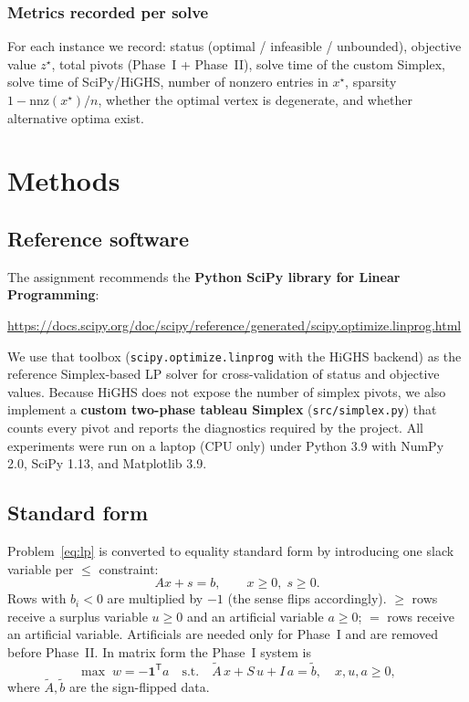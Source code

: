 \documentclass[10pt]{article}
\begin{document}
\subsubsection*{Metrics recorded per solve}
For each instance we record: status (optimal / infeasible / unbounded),
objective value $z^\star$, total pivots (Phase~I + Phase~II), solve time of
the custom Simplex, solve time of SciPy/HiGHS, number of nonzero entries in
$x^\star$, sparsity $1-\mathrm{nnz}(x^\star)/n$, whether the optimal vertex is
degenerate, and whether alternative optima exist.

\section{Methods}
\label{sec:methods}

\subsection{Reference software}
The assignment recommends the \textbf{Python SciPy library for Linear
Programming}:
\begin{center}
\footnotesize\url{https://docs.scipy.org/doc/scipy/reference/generated/scipy.optimize.linprog.html}
\end{center}
We use that toolbox (\texttt{scipy.optimize.linprog} with the HiGHS backend)
as the reference Simplex-based LP solver for cross-validation of status and
objective values.  Because HiGHS does not expose the number of simplex
pivots, we also implement a \textbf{custom two-phase tableau Simplex}
(\texttt{src/simplex.py}) that counts every pivot and reports the
diagnostics required by the project.  All experiments were run on a laptop
(CPU only) under Python 3.9 with NumPy 2.0, SciPy 1.13, and Matplotlib 3.9.

\subsection{Standard form}
Problem~\eqref{eq:lp} is converted to equality standard form by introducing
one slack variable per $\le$ constraint:
\begin{equation}
\label{eq:std}
A x + s = b,\qquad x \ge 0,\; s \ge 0.
\end{equation}
Rows with $b_i < 0$ are multiplied by $-1$ (the sense flips accordingly).
$\ge$ rows receive a surplus variable $u\ge 0$ and an artificial variable
$a\ge 0$; $=$ rows receive an artificial variable.  Artificials are needed
only for Phase~I and are removed before Phase~II.  In matrix form the
Phase~I system is
\begin{equation}
\label{eq:phase1}
\max\; w = -\mathbf{1}^{\mathsf T} a
\quad\text{s.t.}\quad
\tilde{A}\, x + S\, u + I\, a = \tilde{b},\quad x,u,a \ge 0,
\end{equation}
where $\tilde{A},\tilde{b}$ are the sign-flipped data.
\end{document}
